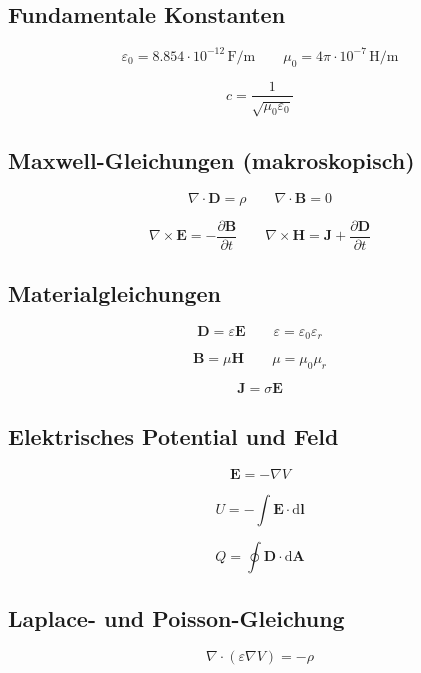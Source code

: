\documentclass[a4paper]{article}
\begin{document}
\subsection{Fundamentale Konstanten}

\[
\varepsilon_0 = 8.854 \cdot 10^{-12}\,\mathrm{F/m}
\qquad
\mu_0 = 4\pi \cdot 10^{-7}\,\mathrm{H/m}
\]

\[
c = \frac{1}{\sqrt{\mu_0\varepsilon_0}}
\]

\subsection{Maxwell-Gleichungen (makroskopisch)}

\[
\nabla \cdot \mathbf{D} = \rho
\qquad
\nabla \cdot \mathbf{B} = 0
\]

\[
\nabla \times \mathbf{E} = -\frac{\partial \mathbf{B}}{\partial t}
\qquad
\nabla \times \mathbf{H}
=
\mathbf{J} + \frac{\partial \mathbf{D}}{\partial t}
\]

\subsection{Materialgleichungen}

\[
\mathbf{D} = \varepsilon \mathbf{E}
\qquad
\varepsilon = \varepsilon_0 \varepsilon_r
\]

\[
\mathbf{B} = \mu \mathbf{H}
\qquad
\mu = \mu_0 \mu_r
\]

\[
\mathbf{J} = \sigma \mathbf{E}
\]

\subsection{Elektrisches Potential und Feld}

\[
\mathbf{E} = -\nabla V
\]

\[
U = -\int \mathbf{E}\cdot \mathrm d\mathbf{l}
\]

\[
Q = \oint \mathbf{D}\cdot \mathrm d\mathbf{A}
\]

\subsection{Laplace- und Poisson-Gleichung}

\[
\nabla \cdot (\varepsilon \nabla V) = -\rho
\]
\end{document}

